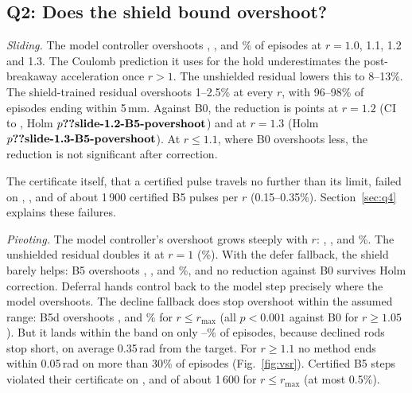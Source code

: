 \subsection{Q2: Does the shield bound overshoot?}
\emph{Sliding.} The model controller overshoots , ,  and \% of episodes at $r=1.0$, 1.1, 1.2 and 1.3. The Coulomb prediction it uses for the hold underestimates the post-breakaway acceleration once $r>1$. The unshielded residual lowers this to 8--13\%. The shield-trained residual overshoots 1--2.5\% at every $r$, with 96--98\% of episodes ending within 5\,mm. Against B0, the reduction is  points at $r=1.2$ (CI  to , Holm $p\N{slide-1.2-B5-povershoot}$) and  at $r=1.3$ (Holm $p\N{slide-1.3-B5-povershoot}$). At $r\le1.1$, where B0 overshoots less, the reduction is not significant after correction.

The certificate itself, that a certified pulse travels no further than its limit, failed on , ,  and  of about 1\,900 certified B5 pulses per $r$ (0.15--0.35\%). Section~\ref{sec:q4} explains these failures.

\emph{Pivoting.} The model controller's overshoot grows steeply with $r$: , ,  and \%. The unshielded residual doubles it at $r=1$ (\%). With the defer fallback, the shield barely helps: B5 overshoots , ,  and \%, and no reduction against B0 survives Holm correction. Deferral hands control back to the model step precisely where the model overshoots. The decline fallback does stop overshoot within the assumed range: B5d overshoots ,  and \% for $r\le r_{\max}$ (all $p<0.001$ against B0 for $r\ge1.05$). But it lands within the band on only --\% of episodes, because declined rods stop short, on average 0.35\,rad from the target. For $r\ge1.1$ no method ends within 0.05\,rad on more than 30\% of episodes (Fig.~\ref{fig:vsr}). Certified B5 steps violated their certificate on ,  and  of about 1\,600 for $r\le r_{\max}$ (at most 0.5\%).

